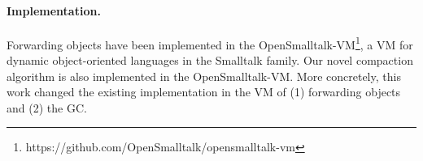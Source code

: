\documentclass[sigplan,10pt,review,anonymous]{acmart}\settopmatter{printfolios=true,printccs=false,printacmref=false}
\def\OpenSmalltalkVM{OpenSmalltalk-VM\xspace}
\begin{document}


\paragraph{Implementation.} Forwarding objects have been implemented in the \OpenSmalltalkVM\footnote{https://github.com/OpenSmalltalk/opensmalltalk-vm}, a VM for dynamic object-oriented languages in the Smalltalk family.
Our novel compaction algorithm is also implemented in the \OpenSmalltalkVM. 
More concretely, this work changed the existing implementation in the VM of (1) forwarding objects and (2) the GC. 
\end{document}
